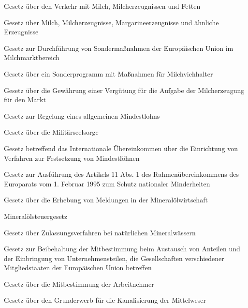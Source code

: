 \item[{MilchFettG}] Gesetz über den Verkehr mit Milch, Milcherzeugnissen und Fetten

\item[{MilchMargG}] Gesetz über Milch, Milcherzeugnisse, Margarineerzeugnisse und ähnliche Erzeugnisse

\item[{MilchSonMaßG}] Gesetz zur Durchführung von Sondermaßnahmen der Europäischen Union im Milchmarktbereich

\item[{MilchSoPrG}] Gesetz über ein Sonderprogramm mit Maßnahmen für Milchviehhalter

\item[{MilchVergG}] Gesetz über die Gewährung einer Vergütung für die Aufgabe der Milcherzeugung für den Markt

\item[{MiLoG}] Gesetz zur Regelung eines allgemeinen Mindestlohns

\item[{MilSeelsG}] Gesetz über die Militärseelsorge

\item[{MindlohnÜbkG}] Gesetz betreffend das Internationale Übereinkommen über die Einrichtung von Verfahren zur Festsetzung von Mindestlöhnen

\item[{MindNamÄndG}] Gesetz zur Ausführung des Artikels 11 Abs. 1 des Rahmenübereinkommens des Europarats vom 1. Februar 1995 zum Schutz nationaler Minderheiten

\item[{MinÖlDatG}] Gesetz über die Erhebung von Meldungen in der Mineralölwirtschaft

\item[{MinöStG-1993}] Mineralölsteuergesetz

\item[{MinWZulG}] Gesetz über Zulassungsverfahren bei natürlichen Mineralwässern

\item[{MitbestBeiG}] Gesetz zur Beibehaltung der Mitbestimmung beim Austausch von Anteilen und der Einbringung von Unternehmensteilen, die Gesellschaften verschiedener Mitgliedstaaten der Europäischen Union betreffen

\item[{MitbestG}] Gesetz über die Mitbestimmung der Arbeitnehmer

\item[{MittelweserG}] Gesetz über den Grunderwerb für die Kanalisierung der Mittelweser

